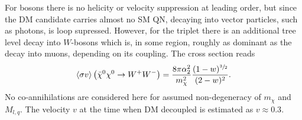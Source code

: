For bosons there is no helicity or velocity suppression at leading order, but since the DM candidate carries almost no SM QN, decaying into vector
particles, such as photons, is loop supressed. However, for the triplet there is an additional tree level decay into $W$-bosons which is, in some 
region, roughly as dominant as the decay into muons, depending on its coupling. The cross section reads\cite{1401.6212}
\begin{align}
 \langle \sigma v \rangle \left(\bar \chi^0 \chi^0 \rightarrow W^+W^-\right) = \frac{8\pi \alpha_2^2}{m_\chi^2} \frac{(1-w)^{\sfrac32}}{(2-w)^2}.
\end{align}
No co-annihilations are considered here for assumed non-degeneracy of $m_\chi$ and $M_{l,q}$. The velocity $v$ at the time when DM decoupled is
estimated as $v\approx 0.3$. 
